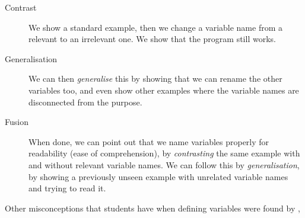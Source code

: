 \begin{description}
    \item [Contrast] We show a standard example, then we change a variable 
name from a relevant to an irrelevant one. We show that the program 
still works.
    \item [Generalisation] We can then \emph{generalise} this by showing 
that we can rename the other variables too, and even show other 
examples where the variable names are disconnected from the purpose.
    \item [Fusion] When done, we can point out that we name variables 
properly for readability 
(ease of comprehension), by \emph{contrasting} the same example with and 
without relevant variable names.
We can follow this by \emph{generalisation}, by showing a previously unseen 
example with unrelated variable names and trying to read it.
\end{description}


Other misconceptions that students have when defining variables were found 
by \textcite{GuoMarkelZhang2020},

